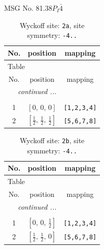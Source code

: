 \documentclass[fleqn,8pt]{jsarticle}
\begin{document}
\setcounter{MaxMatrixCols}{32}

\renewcommand{\tablename}{Table~}
\renewcommand{\figurename}{Figure~}
\begin{center}
\LARGE
MSG No. 81.38\quad$P_{I}\bar{4}$
\end{center}
\renewcommand{\arraystretch}{1.2}
\begin{longtable}{ccc}
\caption{Wyckoff site: {\tt 2a}, site symmetry: {\tt -4..}}
 \\
 \hline \hline
No. & position & mapping \\ \hline \endfirsthead

\multicolumn{2}{l}{\tablename\ \thetable{}} \\
 \hline \hline
No. & position & mapping \\ \hline \endhead

 \hline \hline
\multicolumn{2}{r}{\footnotesize\it continued ...} \\ \endfoot

 \hline \hline
\multicolumn{2}{r}{} \\ \endlastfoot

1 & $\left[ 0,\, 0,\, 0 \right]$ & {\tt [1,2,3,4]} \\ \hline
2 & $\left[ \frac{1}{2},\, \frac{1}{2},\, \frac{1}{2} \right]$ & {\tt [5,6,7,8]} \\
\end{longtable}
\renewcommand{\arraystretch}{1.2}
\begin{longtable}{ccc}
\caption{Wyckoff site: {\tt 2b}, site symmetry: {\tt -4..}}
 \\
 \hline \hline
No. & position & mapping \\ \hline \endfirsthead

\multicolumn{2}{l}{\tablename\ \thetable{}} \\
 \hline \hline
No. & position & mapping \\ \hline \endhead

 \hline \hline
\multicolumn{2}{r}{\footnotesize\it continued ...} \\ \endfoot

 \hline \hline
\multicolumn{2}{r}{} \\ \endlastfoot

1 & $\left[ 0,\, 0,\, \frac{1}{2} \right]$ & {\tt [1,2,3,4]} \\ \hline
2 & $\left[ \frac{1}{2},\, \frac{1}{2},\, 0 \right]$ & {\tt [5,6,7,8]} \\
\end{longtable}
\end{document}
